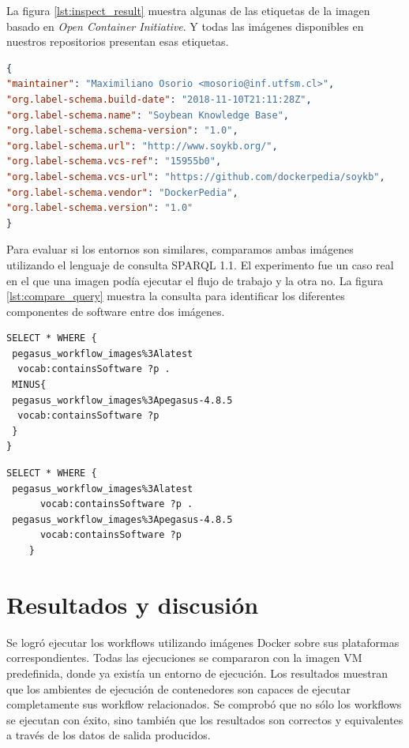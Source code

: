 La figura \ref{lst:inspect_result} muestra algunas de las etiquetas de la imagen basado en \textit{Open Container Initiative}. Y todas las imágenes disponibles en nuestros repositorios presentan esas etiquetas.

\begin{lstlisting}[caption={Inspect image annotations},label={lst:inspect_result},language=json]
{
"maintainer": "Maximiliano Osorio <mosorio@inf.utfsm.cl>",
"org.label-schema.build-date": "2018-11-10T21:11:28Z",
"org.label-schema.name": "Soybean Knowledge Base",
"org.label-schema.schema-version": "1.0",
"org.label-schema.url": "http://www.soykb.org/",
"org.label-schema.vcs-ref": "15955b0",
"org.label-schema.vcs-url": "https://github.com/dockerpedia/soykb",
"org.label-schema.vendor": "DockerPedia",
"org.label-schema.version": "1.0"
}

\end{lstlisting}


Para evaluar si los entornos son similares, comparamos ambas imágenes utilizando el lenguaje de consulta SPARQL 1.1. El experimento fue un caso real en el que una imagen podía ejecutar el flujo de trabajo y la otra no. 
La figura \ref{lst:compare_query} muestra la consulta para identificar los diferentes componentes de software entre dos imágenes.

\begin{lstlisting}[caption={¿Cuáles son los diferentes componentes entre dos imágenes?},label={lst:compare_query},language=sparql]
SELECT * WHERE {
 pegasus_workflow_images%3Alatest
  vocab:containsSoftware ?p .
 MINUS{
 pegasus_workflow_images%3Apegasus-4.8.5
  vocab:containsSoftware ?p   
 }
}
\end{lstlisting}

\begin{lstlisting}[caption={¿Cuáles son los componentes que comparten entre dos imágenes?},label={lst:compare_query},language=sparql]
SELECT * WHERE {
 pegasus_workflow_images%3Alatest
      vocab:containsSoftware ?p .
 pegasus_workflow_images%3Apegasus-4.8.5
      vocab:containsSoftware ?p   
    }
    \end{lstlisting}
    
    
\section{Resultados y discusión}\label{s5.4}
Se logró ejecutar los workflows utilizando imágenes Docker sobre sus plataformas correspondientes.
Todas las ejecuciones se compararon con la imagen VM predefinida, donde ya existía un entorno de ejecución. Los resultados muestran que los ambientes de ejecución de contenedores son capaces de ejecutar completamente sus workflow relacionados. Se  comprobó que no sólo los workflows se ejecutan con éxito, sino también que los resultados son correctos y equivalentes a través de los datos de salida producidos. 

